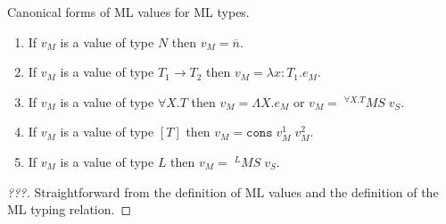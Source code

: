 \begin{mcf}
\label{mcf}
Canonical forms of ML values for ML types.
\begin{enumerate}
\item If $v_{M}$ is a value of type $N$ then $v_{M}=\overline{n}$.
\item If $v_{M}$ is a value of type $T_{1}\rightarrow T_{2}$ then $v_{M}=\lambda x:T_{1}.e_{M}$.
\item If $v_{M}$ is a value of type $\forall X.T$ then $v_{M}=\Lambda X.e_{M}$ or $v_{M}=\;^{\forall X.T}MS\;v_{S}$.
\item If $v_{M}$ is a value of type $[T]$ then $v_{M}=\mathtt{cons}\;v_{M}^{1}\;v_{M}^{2}$.
\item If $v_{M}$ is a value of type $L$ then $v_{M}=\;^{L}MS\;v_{S}$.
\end{enumerate}
\begin{proof}
[???] Straightforward from the definition of ML values and the definition of the ML typing relation.
\end{proof}
\end{mcf}